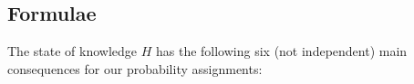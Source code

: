 \documentclass{article}
\theoremstyle{innote}
\newcommand*{\yH}{\varEta}
\renewcommand*{\|}{\cond}
\newcommand*{\+}{\lor}
\let\varEta H
\begin{document}
\subsection{Formulae}
\label{sec:main_formulae}

The state of knowledge $\yH$ has the following six (not independent) main
consequences for our probability assignments:
\end{document}
